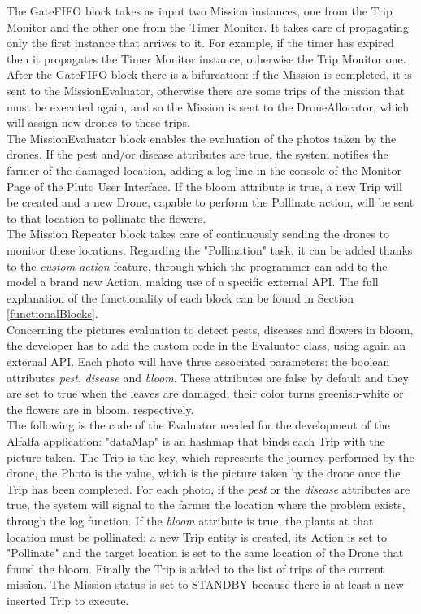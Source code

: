 The GateFIFO block takes as input two Mission instances, one from the Trip Monitor and the other one from the Timer Monitor.
It takes care of propagating only the first instance that arrives to it.
For example, if the timer has expired then it propagates the Timer Monitor instance, otherwise the Trip Monitor one.
\\

After the GateFIFO block there is a bifurcation:
if the Mission is completed, it is sent to the MissionEvaluator, otherwise there are some trips of the mission that must be executed again, and so the Mission is sent to the DroneAllocator, which will assign new drones to these trips.
\\

The MissionEvaluator block enables the evaluation of the photos taken by the drones. If the pest and/or disease attributes are true, the system notifies the farmer of the damaged location, adding a log line in the console of the Monitor Page of the Pluto User Interface.
If the bloom attribute is true, a new Trip will be created and a new Drone, capable to perform the Pollinate action, will be sent to that location to pollinate the flowers.
\\

The Mission Repeater block takes care of continuously sending the drones to monitor these locations.
Regarding the "Pollination" task, it can be added thanks to the \textit{custom action} feature, through which the programmer can add to the model a brand new Action, making use of a specific external API.
The full explanation of the functionality of each block can be found in Section \ref{functionalBlocks}.
\\

Concerning the pictures evaluation to detect pests, diseases and flowers in bloom, the developer has to add the custom code in the Evaluator class, using again an external API. 
Each photo will have three associated parameters: the boolean attributes \textit{pest}, \textit{disease} and \textit{bloom}.
These attributes are false by default and they are set to true when the leaves are damaged, their color turns greenish-white or the flowers are in bloom, respectively. 
\\

The following is the code of the Evaluator needed for the development of the Alfalfa\cite{alfalfa} application:
"dataMap" is an hashmap that binds each Trip with the picture taken. 
The Trip is the key, which represents the journey performed by the drone, the Photo is the value, which is the picture taken by the drone once the Trip has been completed.
For each photo, if the \textit{pest} or the \textit{disease} attributes are true, the system will signal to the farmer the location where the problem exists, through the log function.
If the \textit{bloom} attribute is true, the plants at that location must be pollinated: a new Trip entity is created, its Action is set to "Pollinate" and the target location is set to the same location of the Drone that found the bloom.
Finally the Trip is added to the list of trips of the current mission.
The Mission status is set to STANDBY because there is at least a new inserted Trip to execute.
\\


